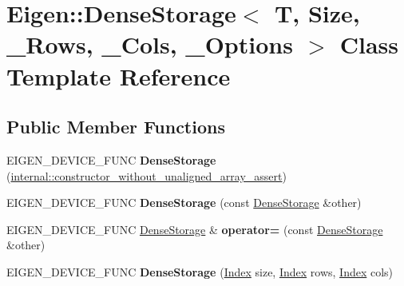 \hypertarget{class_eigen_1_1_dense_storage}{}\section{Eigen\+:\+:Dense\+Storage$<$ T, Size, \+\_\+\+Rows, \+\_\+\+Cols, \+\_\+\+Options $>$ Class Template Reference}
\label{class_eigen_1_1_dense_storage}
\subsection*{Public Member Functions}
\begin{DoxyCompactItemize}
\item 
\mbox{\label{class_eigen_1_1_dense_storage_a3ef428e5df9526e6a207ced6e8679e54}} 
E\+I\+G\+E\+N\+\_\+\+D\+E\+V\+I\+C\+E\+\_\+\+F\+U\+NC {\bfseries Dense\+Storage} (\hyperlink{struct_eigen_1_1internal_1_1constructor__without__unaligned__array__assert}{internal\+::constructor\+\_\+without\+\_\+unaligned\+\_\+array\+\_\+assert})
\item 
\mbox{\label{class_eigen_1_1_dense_storage_adfc3fa9ef776cb8406879c8f1a0c508d}} 
E\+I\+G\+E\+N\+\_\+\+D\+E\+V\+I\+C\+E\+\_\+\+F\+U\+NC {\bfseries Dense\+Storage} (const \hyperlink{class_eigen_1_1_dense_storage}{Dense\+Storage} \&other)
\item 
\mbox{\label{class_eigen_1_1_dense_storage_ab4f92e33490b8208b1f7efcf8c4d32bb}} 
E\+I\+G\+E\+N\+\_\+\+D\+E\+V\+I\+C\+E\+\_\+\+F\+U\+NC \hyperlink{class_eigen_1_1_dense_storage}{Dense\+Storage} \& {\bfseries operator=} (const \hyperlink{class_eigen_1_1_dense_storage}{Dense\+Storage} \&other)
\item 
\mbox{\label{class_eigen_1_1_dense_storage_aeff6f95d3021dd0990065a935919ac15}} 
E\+I\+G\+E\+N\+\_\+\+D\+E\+V\+I\+C\+E\+\_\+\+F\+U\+NC {\bfseries Dense\+Storage} (\hyperlink{namespace_eigen_a62e77e0933482dafde8fe197d9a2cfde}{Index} size, \hyperlink{namespace_eigen_a62e77e0933482dafde8fe197d9a2cfde}{Index} rows, \hyperlink{namespace_eigen_a62e77e0933482dafde8fe197d9a2cfde}{Index} cols)
\item 
\mbox{\label{class_eigen_1_1_dense_storage_aa962cfc93aeecafaf59744ac021289e7}} 

\end{DoxyCompactItemize}
